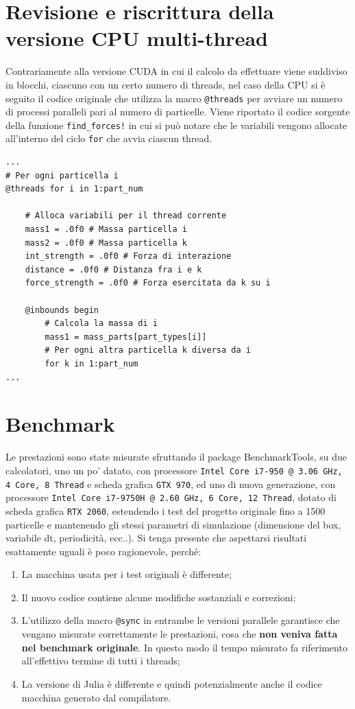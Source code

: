 \documentclass[11pt, a4paper]{article}
\begin{document}
\section{Revisione e riscrittura della versione CPU multi-thread}
Contrariamente alla versione CUDA in cui il calcolo da effettuare viene suddiviso in blocchi, ciascuno con un certo numero di threads, nel caso della CPU si è seguito il codice originale che utilizza la macro \texttt{@threads} per avviare un numero di processi paralleli pari al numero di particelle.
Viene riportato il codice sorgente della funzione \texttt{find\_forces!} in cui si può notare che le variabili vengono allocate all'interno del ciclo \texttt{for} che avvia ciascun thread.
\begin{verbatim}
...
# Per ogni particella i
@threads for i in 1:part_num
        
    # Alloca variabili per il thread corrente
    mass1 = .0f0 # Massa particella i
    mass2 = .0f0 # Massa particella k
    int_strength = .0f0 # Forza di interazione
    distance = .0f0 # Distanza fra i e k        
    force_strength = .0f0 # Forza esercitata da k su i

    @inbounds begin
        # Calcola la massa di i
        mass1 = mass_parts[part_types[i]]
        # Per ogni altra particella k diversa da i
        for k in 1:part_num
...
\end{verbatim}

\section{Benchmark}
Le prestazioni sono state misurate sfruttando il package BenchmarkTools, su due calcolatori, uno un po' datato, con processore \texttt{Intel Core i7-950 @ 3.06 GHz, 4 Core, 8 Thread} e scheda grafica \texttt{GTX 970}, ed uno di nuova generazione, con processore \texttt{Intel Core i7-9750H @ 2.60 GHz, 6 Core, 12 Thread}, dotato di scheda grafica \texttt{RTX 2060}, estendendo i test del progetto originale fino a 1500 particelle e mantenendo gli stessi parametri di simulazione (dimensione del box, variabile dt, periodicità, ecc..).
Si tenga presente che aspettarsi risultati esattamente uguali è poco ragionevole, perché: 
\begin{enumerate}
    \item La macchina usata per i test originali è differente; 
    \item Il nuovo codice contiene alcune modifiche sostanziali e correzioni;
    \item L'utilizzo della macro \texttt{@sync} in entrambe le versioni parallele garantisce che vengano misurate correttamente le prestazioni, cosa che \textbf{non veniva fatta nel benchmark originale}. In questo modo il tempo misurato fa riferimento all'effettivo termine di tutti i threads;
    \item La versione di Julia è differente e quindi potenzialmente anche il codice macchina generato dal compilatore.
\end{enumerate}
\end{document}
